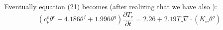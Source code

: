 Eventually equation (21) becomes (after realizing that we have also ):
\begin{equation}
(c_p^e \theta^e + 4.186 \theta^f + 1.996 \theta^g) \frac{\partial T_c}{\partial t} = 2.26 + 2.19 T_c \nabla \cdot ( K_w  \theta^g)
\end{equation}